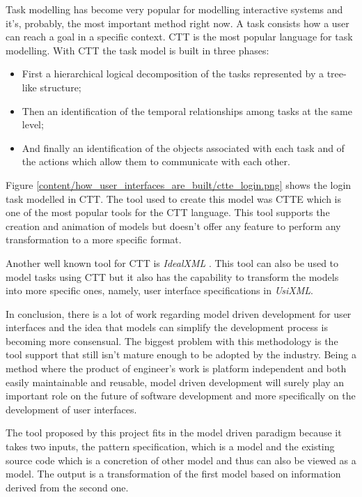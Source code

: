 Task modelling has become very popular for modelling interactive systems and it's, probably, the most important method right now. A task consists how a user can reach a goal in a specific context. CTT is the most popular language for task modelling. With CTT the task model is built in three phases:
\begin{itemize}
\item First a hierarchical logical decomposition of the tasks represented by a tree-like structure;
\item Then an identification of the temporal relationships among tasks at the same level;
\item And finally an identification of the objects associated with each task and of the actions which allow them to communicate with each other.
\end{itemize} 

Figure \ref{content/how_user_interfaces_are_built/ctte_login.png} shows the login task modelled in CTT. The tool used to create this model was CTTE \cite{ConcurTaskTrees_Environment} which is one of the most popular tools for the CTT language. This tool supports the creation and animation of models but doesn’t offer any feature to perform any transformation to a more specific format.

Another well known tool for CTT is \textit{IdealXML} \cite{IdealXml_An_Interaction_Design_Tool}. This tool can also be used to model tasks using CTT but it also has the capability to transform the models into more specific ones, namely, user interface specifications in \textit{UsiXML}.

In conclusion, there is a lot of work regarding model driven development for user interfaces and the idea that models can simplify the development process is becoming more consensual. The biggest problem with this methodology is the tool support that still isn't mature enough to be adopted by the industry. Being a method where the product of engineer's work is platform independent and both easily maintainable and reusable, model driven development will surely play an important role on the future of software development and more specifically on the development of user interfaces.

The tool proposed by this project fits in the model driven paradigm because it takes two inputs, the pattern specification, which is a model and the existing source code which is a concretion of other model and thus can also be viewed as a model. The output is a transformation of the first model based on information derived from the second one.